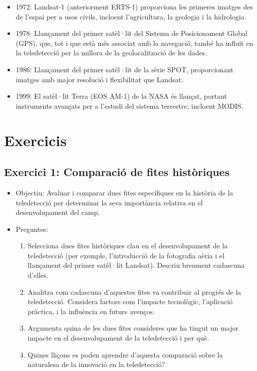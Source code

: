 \documentclass[
]{book}
\providecommand{\tightlist}{%
  \setlength{\itemsep}{0pt}\setlength{\parskip}{0pt}}
\begin{document}
\begin{itemize}
\tightlist
\item
  1972: Landsat-1 (anteriorment ERTS-1) proporciona les primeres imatges des de l'espai per a usos civils, incloent l'agricultura, la geologia i la hidrologia.
\item
  1978: Llançament del primer satèl·lit del Sistema de Posicionament Global (GPS), que, tot i que està més associat amb la navegació, també ha influït en la teledetecció per la millora de la geolocalització de les dades.
\item
  1986: Llançament del primer satèl·lit de la sèrie SPOT, proporcionant imatges amb major resolució i flexibilitat que Landsat.
\item
  1999: El satèl·lit Terra (EOS AM-1) de la NASA és llançat, portant instruments avançats per a l'estudi del sistema terrestre, incloent MODIS.
\end{itemize}

\hypertarget{exercicis-2}{%
\section{Exercicis}\label{exercicis-2}}

\hypertarget{exercici-1-comparaciuxf3-de-fites-histuxf2riques}{%
\subsection*{Exercici 1: Comparació de fites històriques}\label{exercici-1-comparaciuxf3-de-fites-histuxf2riques}}

\begin{itemize}
\tightlist
\item
  Objectiu: Avaluar i comparar dues fites específiques en la història de la teledetecció per determinar la seva importància relativa en el desenvolupament del camp.
\item
  Preguntes:

  \begin{enumerate}
  \def\labelenumi{\arabic{enumi}.}
  \tightlist
  \item
    Selecciona dues fites històriques clau en el desenvolupament de la teledetecció (per exemple, l'introducció de la fotografia aèria i el llançament del primer satèl·lit Landsat). Descriu breument cadascuna d'elles.
  \item
    Analitza com cadascuna d'aquestes fites va contribuir al progrés de la teledetecció. Considera factors com l'impacte tecnològic, l'aplicació pràctica, i la influència en futurs avenços.
  \item
    Argumenta quina de les dues fites consideres que ha tingut un major impacte en el desenvolupament de la teledetecció i per què.
  \item
    Quines lliçons es poden aprendre d'aquesta comparació sobre la naturalesa de la innovació en la teledetecció?
  \end{enumerate}
\end{itemize}
\end{document}

